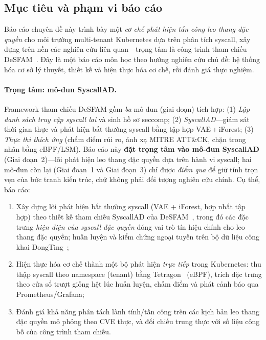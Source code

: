 \subsection{Mục tiêu và phạm vi báo cáo}
Báo cáo chuyên đề này trình bày một \emph{cơ chế phát hiện tấn công leo thang đặc
quyền} cho môi trường multi-tenant Kubernetes dựa trên phân tích syscall, xây dựng
trên nền các nghiên cứu liên quan---trọng tâm là công trình tham chiếu
DeSFAM~\cite{desfam_original}. Đây là một báo cáo môn học theo hướng nghiên cứu
chủ đề: hệ thống hóa cơ sở lý thuyết, thiết kế và hiện thực hóa cơ chế, rồi đánh
giá thực nghiệm.

\paragraph{Trọng tâm: mô-đun SyscallAD.} Framework tham chiếu DeSFAM gồm
\emph{ba} mô-đun (giai đoạn) tích hợp: (1) \emph{Lập danh sách truy cập syscall
lai} và sinh hồ sơ seccomp; (2) \emph{SyscallAD}---giám sát thời gian thực và phát
hiện bất thường syscall bằng tập hợp VAE\,+\,iForest; (3) \emph{Thực thi thích ứng}
(chấm điểm rủi ro, ánh xạ MITRE ATT\&CK, chặn trong nhân bằng eBPF/LSM). Báo cáo
này \textbf{đặt trọng tâm vào mô-đun SyscallAD} (Giai đoạn~2)---lõi phát hiện leo
thang đặc quyền dựa trên hành vi syscall; hai mô-đun còn lại (Giai đoạn~1 và Giai
đoạn~3) chỉ được \emph{điểm qua} để giữ tính trọn vẹn của bức tranh kiến trúc, chứ
không phải đối tượng nghiên cứu chính. Cụ thể, báo cáo:
\begin{enumerate}[label=(\roman*)]
  \item Xây dựng lõi phát hiện bất thường syscall (VAE + iForest, hợp nhất tập
        hợp) theo thiết kế tham chiếu SyscallAD của DeSFAM~\cite{desfam_original},
        trong đó các đặc trưng \emph{hiện diện của syscall đặc quyền} đóng vai trò
        tín hiệu chính cho leo thang đặc quyền; huấn luyện và kiểm chứng ngoại tuyến
        trên bộ dữ liệu công khai DongTing~\cite{ref26_dongtingdataset};
  \item Hiện thực hóa cơ chế thành một bộ phát hiện \emph{trực tiếp} trong
        Kubernetes: thu thập syscall theo namespace (tenant) bằng
        Tetragon~\cite{tetragon} (eBPF), trích đặc trưng theo cửa sổ trượt giống hệt
        lúc huấn luyện, chấm điểm và phát cảnh báo qua Prometheus/Grafana;
  \item Đánh giá khả năng phân tách lành tính/tấn công trên các kịch bản leo thang
        đặc quyền mô phỏng theo CVE thực, và đối chiếu trung thực với số liệu công
        bố của công trình tham chiếu.
\end{enumerate}

